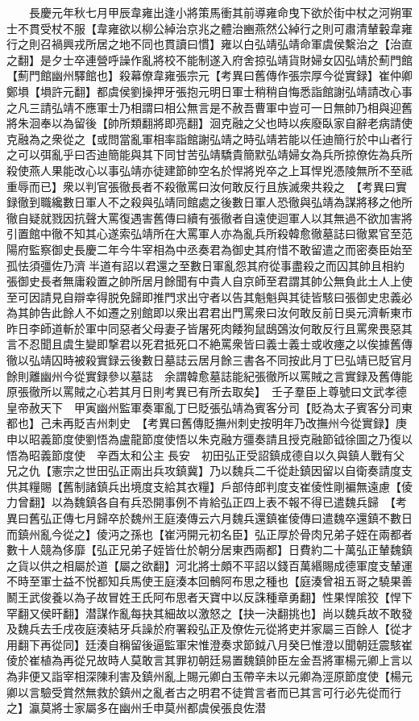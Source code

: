 　　長慶元年秋七月甲辰韋雍出逢小將策馬衝其前導雍命曳下欲於街中杖之河朔軍士不貫受杖不服【韋雍欲以柳公綽治京兆之體治豳燕然公綽行之則可肅清輦轂韋雍行之則召禍興戎所居之地不同也貫讀曰慣】雍以白弘靖弘靖命軍虞侯繫治之【治直之翻】是夕士卒連營呼譟作亂將校不能制遂入府舍掠弘靖貨財婦女囚弘靖於薊門館【薊門館幽州驛館也】殺幕僚韋雍張宗元【考異曰舊傳作張宗厚今從實録】崔仲卿鄭塤【塤許元翻】都虞侯劉操押牙張抱元明日軍士稍稍自悔悉詣館謝弘靖請改心事之凡三請弘靖不應軍士乃相謂曰相公無言是不赦吾曹軍中豈可一日無帥乃相與迎舊將朱洄奉以為留後【帥所類翻將即亮翻】洄克融之父也時以疾廢臥家自辭老病請使克融為之衆從之【或問當亂軍相率詣館謝弘靖之時弘靖若能以任迪簡行於中山者行之可以弭亂乎曰否迪簡能與其下同甘苦弘靖驕貴簡默弘靖婦女為兵所掠僚佐為兵所殺使燕人果能改心以事弘靖亦徒建節帥空名於悍將兇卒之上耳悍兇憑陵無所不至祗重辱而已】衆以判官張徹長者不殺徹罵曰汝何敢反行且族滅衆共殺之　【考異曰實録徹到職纔數日軍人不之殺與弘靖同館處之後數日軍人恐徹與弘靖為謀將移之他所徹自疑就戮因抗聲大罵復遇害舊傳曰續有張徹者自遠使迴軍人以其無過不欲加害將引置館中徹不知其心遂索弘靖所在大罵軍人亦為亂兵所殺韓愈徹墓誌曰徹累官至范陽府監察御史長慶二年今牛宰相為中丞奏君為御史其府惜不敢留遣之而密奏臣始至孤怯須彊佐乃濟半道有詔以君還之至數日軍亂怨其府從事盡殺之而囚其帥且相約張御史長者無庸殺置之帥所居月餘聞有中貴人自京師至君謂其帥公無負此土人上使至可因請見自辯幸得脱免歸即推門求出守者以告其魁魁與其徒皆駭曰張御史忠義必為其帥告此餘人不如遷之别館即以衆出君君出門罵衆曰汝何敢反前日吳元濟斬東市昨日李師道斬於軍中同惡者父母妻子皆屠死肉餧狗鼠鴟鵶汝何敢反行且罵衆畏惡其言不忍聞且虞生變即撃君以死君抵死口不絶罵衆皆曰義士義士或收瘞之以俟據舊傳徹以弘靖囚時被殺實録云後數日墓誌云居月餘三書各不同按此月丁巳弘靖已貶官月餘則離幽州今從實録參以墓誌　余謂韓愈墓誌能紀張徹所以罵賊之言實録及舊傳能原張徹所以罵賊之心若其月日則考異已有所去取矣】　壬子羣臣上尊號曰文武孝德皇帝赦天下　甲寅幽州監軍奏軍亂丁巳貶張弘靖為賓客分司【貶為太子賓客分司東都也】己未再貶吉州刺史　【考異曰舊傳貶撫州刺史按明年乃改撫州今從實録】庚申以昭義節度使劉悟為盧龍節度使悟以朱克融方彊奏請且授克融節钺徐圖之乃復以悟為昭義節度使　辛酉太和公主長安　初田弘正受詔鎮成德自以久與鎮人戰有父兄之仇【憲宗之世田弘正兩出兵攻鎮冀】乃以魏兵二千從赴鎮因留以自衛奏請度支供其糧賜【舊制諸鎮兵出境度支給其衣糧】戶部侍郎判度支崔倰性剛褊無遠慮【倰力曾翻】以為魏鎮各自有兵恐開事例不肯給弘正四上表不報不得已遣魏兵歸　【考異曰舊弘正傳七月歸卒於魏州王庭湊傳云六月魏兵還鎮崔倰傳曰遣魏卒還鎮不數日而鎮州亂今從之】倰沔之孫也【崔沔開元初名臣】弘正厚於骨肉兄弟子姪在兩都者數十人競為侈靡【弘正兄弟子姪皆仕於朝分居東西兩都】日費約二十萬弘正輦魏鎮之貨以供之相屬於道【屬之欲翻】河北將士頗不平詔以錢百萬緡賜成德軍度支輦運不時至軍士益不悦都知兵馬使王庭湊本回鶻阿布思之種也【庭湊曾祖五哥之驍果善鬭王武俊養以為子故冒姓王氏阿布思者天寶中以反誅種章勇翻】性果悍隂狡【悍下罕翻又侯旰翻】潜謀作亂每抉其細故以激怒之【抉一決翻挑也】尚以魏兵故不敢發及魏兵去壬戌夜庭湊結牙兵譟於府署殺弘正及僚佐元從將吏并家屬三百餘人【從才用翻下再從同】廷湊自稱留後逼監軍宋惟澄奏求節鉞八月癸巳惟澄以聞朝廷震駭崔倰於崔植為再從兄故時人莫敢言其罪初朝廷易置魏鎮帥臣左金吾將軍楊元卿上言以為非便又詣宰相深陳利害及鎮州亂上賜元卿白玉帶辛未以元卿為涇原節度使【楊元卿以言驗受賞然無救於鎮州之亂者古之明君不徒賞言者而已其言可行必先從而行之】瀛莫將士家屬多在幽州壬申莫州都虞侯張良佐潜